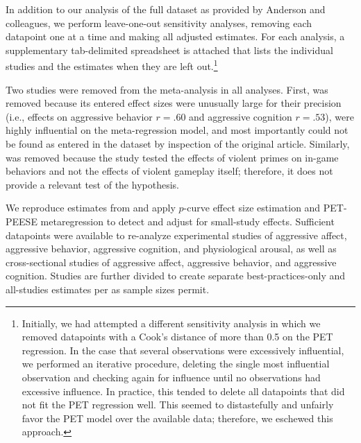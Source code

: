 \documentclass[man]{apa6}
\begin{document}
In addition to our analysis of the full dataset as provided by Anderson and colleagues, we perform leave-one-out sensitivity analyses, removing each datapoint one at a time and making all adjusted estimates. For each analysis, a supplementary tab-delimited spreadsheet is attached that lists the individual studies and the estimates when they are left out.\footnote{Initially, we had attempted a different sensitivity analysis in which we removed datapoints with a Cook's distance of more than 0.5 on the PET regression. In the case that several observations were excessively influential, we performed an iterative procedure, deleting the single most influential observation and checking again for influence until no observations had excessive influence. In practice, this tended to delete all datapoints that did not fit the PET regression well. This seemed to distastefully and unfairly favor the PET model over the available data; therefore, we eschewed this approach.}

Two studies were removed from the meta-analysis in all analyses. First, \citet[study 1]{Matsuzaki:etal:2006} was removed because its entered effect sizes were unusually large for their precision (i.e., effects on aggressive behavior $r = .60$ and aggressive cognition $r = .53$), were highly influential on the meta-regression model, and most importantly could not be found as entered in the \citet{Anderson:etal:2010} dataset by inspection of the original article. %
Similarly, \citet{Panee:Ballard:2002} was removed because the study tested the effects of violent primes on in-game behaviors and not the effects of violent gameplay itself; therefore, it does not provide a relevant test of the hypothesis. %

We reproduce estimates from \citet{Anderson:etal:2010} and apply $p$-curve effect size estimation and PET-PEESE metaregression to detect and adjust for small-study effects. Sufficient datapoints were available to re-analyze experimental studies of aggressive affect, aggressive behavior, aggressive cognition, and physiological arousal, as well as cross-sectional studies of aggressive affect, aggressive behavior, and aggressive cognition. Studies are further divided to create separate best-practices-only and all-studies estimates per \citet{Anderson:etal:2010} as sample sizes permit. 

\end{document}
